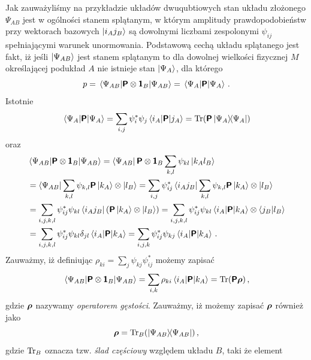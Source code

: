 \documentclass{myclass}
\begin{document}
Jak zauważyliśmy na przykładzie układów dwuqubtiowych stan układu złożonego \(\Psi_{AB}\) jest w
ogólności stanem splątanym, w którym amplitudy prawdopodobieństw przy wektorach bazowych
\(\ket{i_Aj_B}\) są dowolnymi liczbami zespolonymi \(\psi_{ij}\) spełniającymi warunek unormowania.
Podstawową cechą układu splątanego jest fakt, iż jeśli \(\ket{\Psi_{AB}}\) jest stanem splątanym to
dla dowolnej wielkości fizycznej \(M\) określającej podukład \(A\) nie istnieje stan
\(\ket{\Psi_A}\), dla którego
\begin{equation*}
    p = \mel{\Psi_{AB}}{\boldsymbol{\mathsf{P}}\otimes\boldsymbol{\mathsf{1}}_B}{\Psi_{AB}} = \mel{\Psi_A}{\boldsymbol{\mathsf{P}}}{\Psi_A}\,.
\end{equation*}
Istotnie
\begin{equation*}
    \mel{\Psi_A}{\oper{P}}{\Psi_A} = \sum_{i,j} \psi_i^*\psi_j \mel{i_A}{\oper{P}}{j_A} = \Tr(\oper{P}\dyad{\Psi_A})
\end{equation*}
oraz
\begin{equation*}
    \begin{split}
        &\mel{\Psi_{AB}}{\boldsymbol{\mathsf{P}}\otimes\boldsymbol{\mathsf{1}}_B}{\Psi_{AB}} = \bra{\Psi_{AB}}\boldsymbol{\mathsf{P}}\otimes\boldsymbol{\mathsf{1}}_B\sum_{k,l}\psi_{kl}\ket{k_Al_B} \\
        &= \bra{\Psi_{AB}}\sum_{k,l}\psi_{k,l}\boldsymbol{\mathsf{P}}\ket{k_A}\otimes\ket{l_B} = \sum_{i,j}\psi_{ij}^*\bra{i_Aj_B}\sum_{k,l}\psi_{k,l}\boldsymbol{\mathsf{P}}\ket{k_A}\otimes\ket{l_B} \\
        &= \sum_{i,j,k,l}\psi_{ij}^*\psi_{kl}\bra{i_Aj_B}\left(\boldsymbol{\mathsf{P}}\ket{k_A}\otimes\ket{l_B}\right) = \sum_{i,j,k,l}\psi_{ij}^*\psi_{kl}\mel{i_A}{\boldsymbol{\mathsf{P}}}{k_A}\otimes \braket{j_B}{l_B} \\
        &= \sum_{i,j,k,l}\psi_{ij}^*\psi_{kl}\delta_{jl} \mel{i_A}{\boldsymbol{\mathsf{P}}}{k_A} = \sum_{i,j,k} \psi_{ij}^*\psi_{kj} \mel{i_A}{\boldsymbol{\mathsf{P}}}{k_A}\,.
    \end{split}
\end{equation*}
Zauważmy, iż definiując \(\rho_{ki} = \sum_{j} \psi_{kj}\psi_{ij}^*\) możemy zapisać
\begin{equation*}
    \mel{\Psi_{AB}}{\oper{P}\otimes\oper{1}_B}{\Psi_{AB}} = \sum_{i,k}\rho_{ki}\mel{i_A}{\oper{P}}{k_A} = \Trace(\oper{P}\oper{\rho})\,,
\end{equation*}
gdzie \(\boldsymbol{\mathsf{\rho}}\) nazywamy \textit{operatorem gęstości}. Zauważmy, iż możemy zapisać
\(\boldsymbol{\mathsf{\rho}}\) również jako
\begin{equation*}
    \oper{\rho} = \Trace_B(\dyad{\Psi_{AB}})\,,
\end{equation*}
gdzie \(\Trace_B\) oznacza tzw. \textit{ślad częściowy} względem układu \(B\), taki że element
\end{document}
